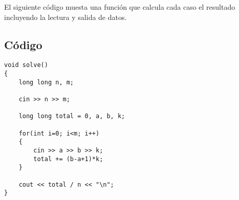 El siguiente código muesta una función que calcula cada caso el resultado
incluyendo la lectura y salida de datos.

\subsection*{Código}
\begin{verbatim}
void solve()
{
	long long n, m;

	cin >> n >> m;

	long long total = 0, a, b, k;

	for(int i=0; i<m; i++)
	{
		cin >> a >> b >> k;
		total += (b-a+1)*k;
	}

	cout << total / n << "\n";
}
\end{verbatim}